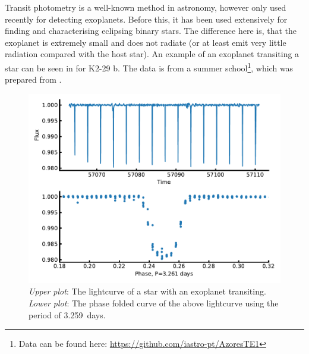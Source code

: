 Transit photometry is a well-known method in astronomy, however only used recently for detecting
exoplanets. Before this, it has been used extensively for finding and characterising eclipsing
binary stars. The difference here is, that the exoplanet is extremely small and does not radiate (or
at least emit very little radiation compared with the host star). An example of an exoplanet
transiting a star can be seen in  for K2-29 b. The data is from a summer
school\footnote{Data can be found here: \url{https://github.com/iastro-pt/AzoresTE1}}, which was
prepared from \citet{Santerne2016}.

\begin{figure}[htpb!]
    \centering
    \includegraphics[width=1.0\linewidth]{figures/transitMethod.pdf}
    \caption{\emph{Upper plot}: The lightcurve of a star with an exoplanet transiting.
             \emph{Lower plot}: The phase folded curve of the above lightcurve using the period
             of \SI{3.259}{days}.}
    \label{fig:transitMethod}
\end{figure}

